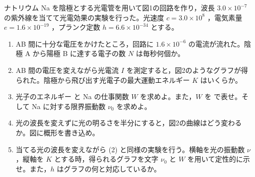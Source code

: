 \item
    \begin{mawarikomi}{150pt}{
        
    }
ナトリウム Na を陰極とする光電管を用いて図1の回路を作り，波長 $3.0 \times 10^{-7}$ の紫外線を当てて光電効果の実験を行った。光速度 $c = 3.0 \times 10^8$ ，電気素量 $e = 1.6 \times 10^{-19}$ ，プランク定数 $h = 6.6 \times 10^{-34}$  とする。
        \begin{enumerate}
            \item AB 間に十分な電圧をかけたところ，回路に $1.6 \times 10^{-6}$  の電流が流れた。陰極 A から陽極 B に達する電子の数 $N$ は毎秒何個か。
            \item AB 間の電圧を変えながら光電流 $I$ を測定すると，図2のようなグラフが得られた。陰極から飛び出す光電子の最大運動エネルギー $K$  はいくらか。
            \item 光子のエネルギー  と Na の仕事関数 $W$  を求めよ。また，$W$ を  で表せ。そして Na に対する限界振動数 $\nu_0$  を求めよ。
            \item 光の波長を変えずに光の明るさを半分にすると，図2の曲線はどう変わるか。図に概形を書き込め。
            \item 当てる光の波長を変えながら (2) と同様の実験を行う。横軸を光の振動数 $\nu$ ，縦軸を $K$  とする時，得られるグラフを文字 $\nu_0$ と $W$ を用いて定性的に示せ。また，$h$ はグラフの何と対応しているか。
        \end{enumerate}
\end{mawarikomi}

